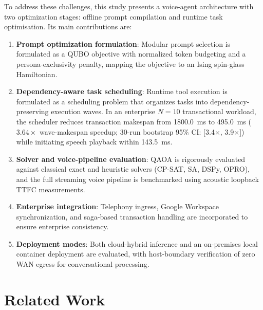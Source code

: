\documentclass[review,12pt,times,authoryear]{elsarticle}
\theoremstyle{definition}
\begin{document}
To address these challenges, this study presents a voice-agent architecture with two optimization stages: offline prompt compilation and runtime task optimisation. Its main contributions are:
\begin{enumerate}[label=\arabic*.]
  \item \textbf{Prompt optimization formulation}: Modular prompt selection is formulated as a QUBO objective with normalized token budgeting and a persona-exclusivity penalty, mapping the objective to an Ising spin-glass Hamiltonian.
  \item \textbf{Dependency-aware task scheduling}: Runtime tool execution is formulated as a scheduling problem that organizes tasks into dependency-preserving execution waves. In an enterprise $N=10$ transactional workload, the scheduler reduces transaction makespan from \SI{1800.0}{\milli\second} to \SI{495.0}{\milli\second} ($3.64\times$ wave-makespan speedup; 30-run bootstrap 95\% CI: [3.4$\times$, 3.9$\times$]) while initiating speech playback within \SI{143.5}{\milli\second}.
  \item \textbf{Solver and voice-pipeline evaluation}: QAOA is rigorously evaluated against classical exact and heuristic solvers (CP-SAT, SA, DSPy, OPRO), and the full streaming voice pipeline is benchmarked using acoustic loopback TTFC measurements.
  \item \textbf{Enterprise integration}: Telephony ingress, Google Workspace synchronization, and saga-based transaction handling are incorporated to ensure enterprise consistency.
  \item \textbf{Deployment modes}: Both cloud-hybrid inference and an on-premises local container deployment are evaluated, with host-boundary verification of zero WAN egress for conversational processing.
\end{enumerate}


\section{Related Work}
\label{sec:related_work}
\end{document}
